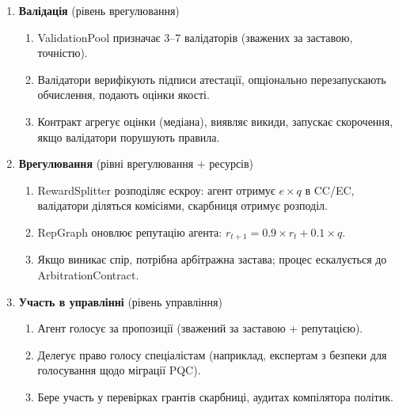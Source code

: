\documentclass[11pt]{article}
\begin{document}
\begin{enumerate}
\begin{enumerate}[label=\alph*.]
      \item TEE генерує звіт атестації: хеш вимірювання (доводить цілісність коду), хеші входу/виходу, мітки часу, споживання енергії.
      \item Агент підписує результат та атестацію, обчислює хеш вмісту, подає через \texttt{submitWork()}.
    \end{enumerate}
  \item \textbf{Валідація} (рівень врегулювання)
    \begin{enumerate}[label=\alph*.]
      \item ValidationPool призначає 3--7 валідаторів (зважених за заставою, точністю).
      \item Валідатори верифікують підписи атестації, опціонально перезапускають обчислення, подають оцінки якості.
      \item Контракт агрегує оцінки (медіана), виявляє викиди, запускає скорочення, якщо валідатори порушують правила.
    \end{enumerate}
  \item \textbf{Врегулювання} (рівні врегулювання + ресурсів)
    \begin{enumerate}[label=\alph*.]
      \item RewardSplitter розподіляє ескроу: агент отримує $e \times q$ в CC/EC, валідатори діляться комісіями, скарбниця отримує розподіл.
      \item RepGraph оновлює репутацію агента: $r_{t+1} = 0.9 \times r_t + 0.1 \times q$.
      \item Якщо виникає спір, потрібна арбітражна застава; процес ескалується до ArbitrationContract.
    \end{enumerate}
  \item \textbf{Участь в управлінні} (рівень управління)
    \begin{enumerate}[label=\alph*.]
      \item Агент голосує за пропозиції (зважений за заставою + репутацією).
      \item Делегує право голосу спеціалістам (наприклад, експертам з безпеки для голосування щодо міграції PQC).
      \item Бере участь у перевірках грантів скарбниці, аудитах компілятора політик.
    \end{enumerate}
\end{enumerate}
\end{document}
